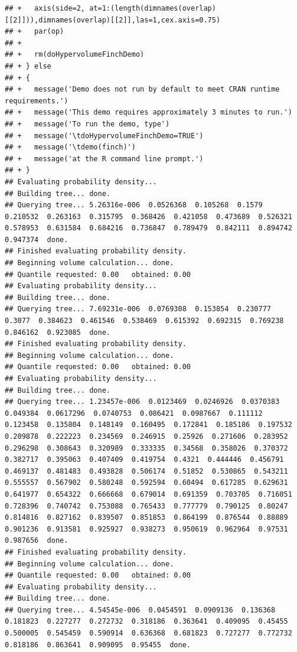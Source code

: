 \documentclass[12pt]{article}\usepackage[]{graphicx}\usepackage[]{color}
\makeatletter
\newenvironment{kframe}{%
 \def\at@end@of@kframe{}%
 \ifinner\ifhmode%
  \def\at@end@of@kframe{\end{minipage}}%
  \begin{minipage}{\columnwidth}%
 \fi\fi%
 \def\FrameCommand##1{\hskip\@totalleftmargin \hskip-\fboxsep
 \colorbox{shadecolor}{##1}\hskip-\fboxsep
     \hskip-\linewidth \hskip-\@totalleftmargin \hskip\columnwidth}%
 \MakeFramed {\advance\hsize-\width
   \@totalleftmargin\z@ \linewidth\hsize
   \@setminipage}}%
 {\par\unskip\endMakeFramed%
 \at@end@of@kframe}
\newenvironment{knitrout}{}{} %
\makeatother
\begin{document}
\begin{knitrout}
\begin{kframe}
\begin{verbatim}
## +   axis(side=2, at=1:(length(dimnames(overlap)[[2]])),dimnames(overlap)[[2]],las=1,cex.axis=0.75)
## +   par(op)
## +   
## +   rm(doHypervolumeFinchDemo)
## + } else
## + {
## +   message('Demo does not run by default to meet CRAN runtime requirements.')
## +   message('This demo requires approximately 3 minutes to run.')  
## +   message('To run the demo, type')
## +   message('\tdoHypervolumeFinchDemo=TRUE')
## +   message('\tdemo(finch)')
## +   message('at the R command line prompt.')
## + }
## Evaluating probability density...
## Building tree... done.
## Querying tree... 5.26316e-006  0.0526368  0.105268  0.1579  0.210532  0.263163  0.315795  0.368426  0.421058  0.473689  0.526321  0.578953  0.631584  0.684216  0.736847  0.789479  0.842111  0.894742  0.947374  done.
## Finished evaluating probability density.
## Beginning volume calculation... done. 
## Quantile requested: 0.00   obtained: 0.00
## Evaluating probability density...
## Building tree... done.
## Querying tree... 7.69231e-006  0.0769308  0.153854  0.230777  0.3077  0.384623  0.461546  0.538469  0.615392  0.692315  0.769238  0.846162  0.923085  done.
## Finished evaluating probability density.
## Beginning volume calculation... done. 
## Quantile requested: 0.00   obtained: 0.00
## Evaluating probability density...
## Building tree... done.
## Querying tree... 1.23457e-006  0.0123469  0.0246926  0.0370383  0.049384  0.0617296  0.0740753  0.086421  0.0987667  0.111112  0.123458  0.135804  0.148149  0.160495  0.172841  0.185186  0.197532  0.209878  0.222223  0.234569  0.246915  0.25926  0.271606  0.283952  0.296298  0.308643  0.320989  0.333335  0.34568  0.358026  0.370372  0.382717  0.395063  0.407409  0.419754  0.4321  0.444446  0.456791  0.469137  0.481483  0.493828  0.506174  0.51852  0.530865  0.543211  0.555557  0.567902  0.580248  0.592594  0.60494  0.617285  0.629631  0.641977  0.654322  0.666668  0.679014  0.691359  0.703705  0.716051  0.728396  0.740742  0.753088  0.765433  0.777779  0.790125  0.80247  0.814816  0.827162  0.839507  0.851853  0.864199  0.876544  0.88889  0.901236  0.913581  0.925927  0.938273  0.950619  0.962964  0.97531  0.987656  done.
## Finished evaluating probability density.
## Beginning volume calculation... done. 
## Quantile requested: 0.00   obtained: 0.00
## Evaluating probability density...
## Building tree... done.
## Querying tree... 4.54545e-006  0.0454591  0.0909136  0.136368  0.181823  0.227277  0.272732  0.318186  0.363641  0.409095  0.45455  0.500005  0.545459  0.590914  0.636368  0.681823  0.727277  0.772732  0.818186  0.863641  0.909095  0.95455  done.

\end{verbatim}
\end{kframe}
\end{knitrout}
\end{document}
